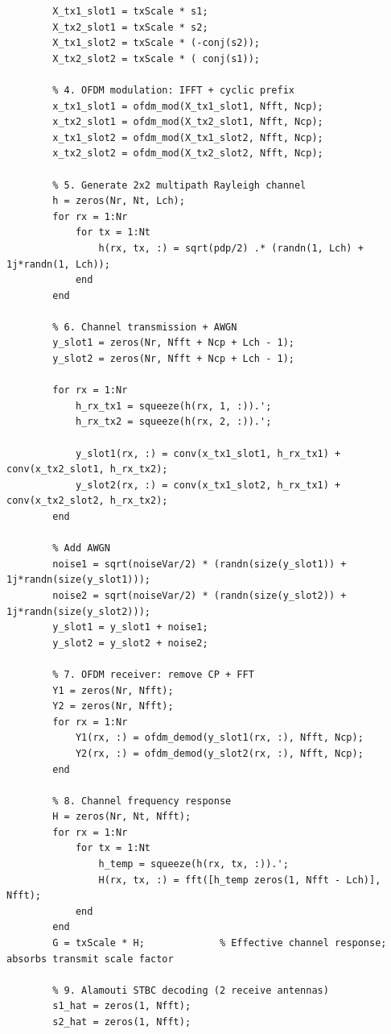 \documentclass[a4paper]{article}
\begin{document}
\begin{lstlisting}[style=matlabstyle]
        % 3. Alamouti STBC encoding in frequency domain
        X_tx1_slot1 = txScale * s1;
        X_tx2_slot1 = txScale * s2;
        X_tx1_slot2 = txScale * (-conj(s2));
        X_tx2_slot2 = txScale * ( conj(s1));

        % 4. OFDM modulation: IFFT + cyclic prefix
        x_tx1_slot1 = ofdm_mod(X_tx1_slot1, Nfft, Ncp);
        x_tx2_slot1 = ofdm_mod(X_tx2_slot1, Nfft, Ncp);
        x_tx1_slot2 = ofdm_mod(X_tx1_slot2, Nfft, Ncp);
        x_tx2_slot2 = ofdm_mod(X_tx2_slot2, Nfft, Ncp);

        % 5. Generate 2x2 multipath Rayleigh channel
        h = zeros(Nr, Nt, Lch);
        for rx = 1:Nr
            for tx = 1:Nt
                h(rx, tx, :) = sqrt(pdp/2) .* (randn(1, Lch) + 1j*randn(1, Lch));
            end
        end

        % 6. Channel transmission + AWGN
        y_slot1 = zeros(Nr, Nfft + Ncp + Lch - 1);
        y_slot2 = zeros(Nr, Nfft + Ncp + Lch - 1);

        for rx = 1:Nr
            h_rx_tx1 = squeeze(h(rx, 1, :)).';
            h_rx_tx2 = squeeze(h(rx, 2, :)).';

            y_slot1(rx, :) = conv(x_tx1_slot1, h_rx_tx1) + conv(x_tx2_slot1, h_rx_tx2);
            y_slot2(rx, :) = conv(x_tx1_slot2, h_rx_tx1) + conv(x_tx2_slot2, h_rx_tx2);
        end

        % Add AWGN
        noise1 = sqrt(noiseVar/2) * (randn(size(y_slot1)) + 1j*randn(size(y_slot1)));
        noise2 = sqrt(noiseVar/2) * (randn(size(y_slot2)) + 1j*randn(size(y_slot2)));
        y_slot1 = y_slot1 + noise1;
        y_slot2 = y_slot2 + noise2;

        % 7. OFDM receiver: remove CP + FFT
        Y1 = zeros(Nr, Nfft);
        Y2 = zeros(Nr, Nfft);
        for rx = 1:Nr
            Y1(rx, :) = ofdm_demod(y_slot1(rx, :), Nfft, Ncp);
            Y2(rx, :) = ofdm_demod(y_slot2(rx, :), Nfft, Ncp);
        end

        % 8. Channel frequency response
        H = zeros(Nr, Nt, Nfft);
        for rx = 1:Nr
            for tx = 1:Nt
                h_temp = squeeze(h(rx, tx, :)).';
                H(rx, tx, :) = fft([h_temp zeros(1, Nfft - Lch)], Nfft);
            end
        end
        G = txScale * H;             % Effective channel response; absorbs transmit scale factor

        % 9. Alamouti STBC decoding (2 receive antennas)
        s1_hat = zeros(1, Nfft);
        s2_hat = zeros(1, Nfft);


\end{lstlisting}
\end{document}
